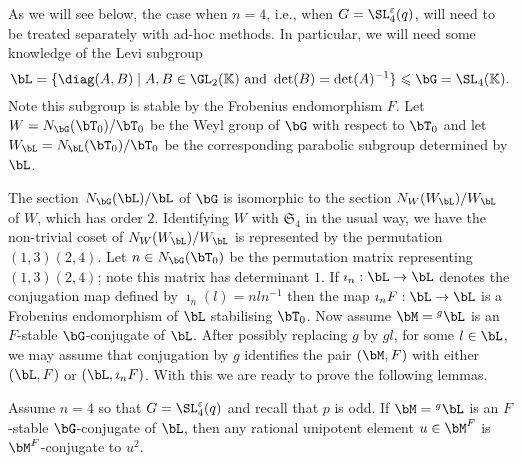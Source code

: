 \documentclass[eqthmnum, nocolour]{jt-calcs}
\begin{document}
\begin{pa}\label{pa:levi-id}
As we will see below, the case when $n=4$, i.e., when $G = \SL_4^{\varepsilon}(q)$, will need to be treated separately with ad-hoc methods. In particular, we will need some knowledge of the Levi subgroup
\begin{equation}\label{eq:levi}
\bL = \{\diag(A,B) \mid A,B \in \GL_2(\mathbb{K}) \text{ and }\det(B) = \det(A)^{-1}\} \leqslant \bG = \SL_4(\mathbb{K}).
\end{equation}
Note this subgroup is stable by the Frobenius endomorphism $F$. Let $W = N_{\bG}(\bT_0)/\bT_0$ be the Weyl group of $\bG$ with respect to $\bT_0$ and let $W_{\bL} = N_{\bL}(\bT_0)/\bT_0$ be the corresponding parabolic subgroup determined by $\bL$.

The section $N_{\bG}(\bL)/\bL$ of $\bG$ is isomorphic to the section $N_W(W_{\bL})/W_{\bL}$ of $W$, which has order $2$. Identifying $W$ with $\mathfrak{S}_4$ in the usual way, we have the non-trivial coset of $N_W(W_{\bL})/W_{\bL}$ is represented by the permutation $(1,3)(2,4)$. Let $n \in N_{\bG}(\bT_0)$ be the permutation matrix representing $(1,3)(2,4)$; note this matrix has determinant $1$. If $\imath_n : \bL \to \bL$ denotes the conjugation map defined by $\imath_n(l) = nln^{-1}$ then the map $\imath_nF : \bL \to \bL$ is a Frobenius endomorphism of $\bL$ stabilising $\bT_0$. Now assume $\bM = {}^g\bL$ is an $F$-stable $\bG$-conjugate of $\bL$. After possibly replacing $g$ by $gl$, for some $l \in \bL$, we may assume that conjugation by $g$ identifies the pair $(\bM,F)$ with either $(\bL,F)$ or $(\bL,\imath_nF)$. With this we are ready to prove the following lemmas.
\end{pa}

\begin{lem}\label{lem:L-u-u2-conj}
Assume $n = 4$ so that $G = \SL_4^{\varepsilon}(q)$ and recall that $p$ is odd. If $\bM = {}^g\bL$ is an $F$-stable $\bG$-conjugate of $\bL$, then any rational unipotent element $u \in \bM^F$ is $\bM^F$-conjugate to $u^2$.
\end{lem}
\end{document}
